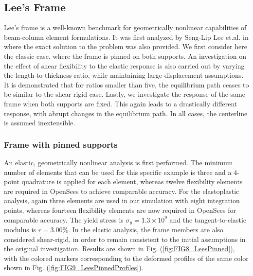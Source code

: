 \subsection{Lee's Frame}
Lee's frame is a well-known benchmark for geometrically nonlinear capabilities
of beam-column element formulations.  It was first analyzed by Seng-Lip Lee
et.al. in
\cite{Lee} where the exact solution to the problem was also provided. We
first consider here the classic case, where the frame is pinned on both 
supports.
An investigation on the effect of shear flexibility to the elastic response
is also carried out by varying the length-to-thickness ratio, while maintaining
large-displacement assumptions. It is demonstrated that for ratios smaller than
five, the equilibrium path ceases to be similar to the shear-rigid case. Lastly,
we investigate the response of the same frame when both supports are fixed. This
again leads to a drastically different response, with abrupt changes in the
equilibrium path.  In all cases, the centerline is assumed inextensible.

\subsubsection{Frame with pinned supports}\label{leespinned}

An elastic, geometrically nonlinear analysis is first performed.
The minimum number of elements that can be used for this specific example is 
three
and a 4-point quadrature is applied for each element, whereas twelve flexibility
elements are required in OpenSees to achieve comparable accuracy.
For the elastoplastic analysis, again three elements are used in our
simulation with eight integration points,
whereas fourteen flexibility elements are now required in OpenSees for 
comparable
accuracy. The yield stress is $\sigma_y=1.3\times 10^{9}$ and the
tangent-to-elastic modulus \ratio is $r=3.00\%$. In the elastic
analysis, the
frame members are also considered shear-rigid, in order to remain consistent
to the initial assumptions in the original investigation\cite{Lee}.
Results are shown in Fig. (\ref{fig:FIG8_LeesPinned}), with the colored
markers corresponding to the deformed profiles of the same color shown in
Fig. (\ref{fig:FIG9_LeesPinnedProfiles}).

\begin{figure*}[t]
	\centering
	\qquad
	\caption{Geometrically nonlinear analyses of Lee's frame with pinned
		supports.}%
	\label{fig:FIG8_LeesPinned}%
\end{figure*}

